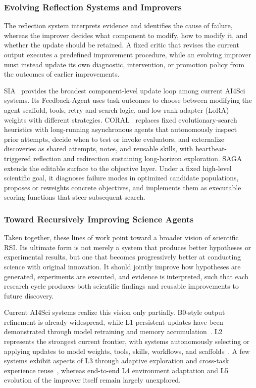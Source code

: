 \subsubsection{Evolving Reflection Systems and Improvers}

The reflection system interprets evidence and identifies the cause of failure, whereas the improver decides what component to modify, how to modify it, and whether the update should be retained. A fixed critic that revises the current output executes a predefined improvement procedure, while an evolving improver must instead update its own diagnostic, intervention, or promotion policy from the outcomes of earlier improvements.

SIA~\cite{hebbar2026sia} provides the broadest component-level update loop among current AI4Sci systems. Its Feedback-Agent uses task outcomes to choose between modifying the agent scaffold, tools, retry and search logic, and low-rank adapter (LoRA) weights with different strategies. 
CORAL~\cite{qu2026coral} replaces fixed evolutionary-search heuristics with long-running asynchronous agents that autonomously inspect prior attempts, decide when to test or invoke evaluators, and externalize discoveries as shared attempts, notes, and reusable skills, with heartbeat-triggered reflection and redirection sustaining long-horizon exploration.
SAGA~\cite{du2025saga} extends the editable surface to the objective layer. Under a fixed high-level scientific goal, it diagnoses failure modes in optimized candidate populations, proposes or reweights concrete objectives, and implements them as executable scoring functions that steer subsequent search.



\subsubsection{Toward Recursively Improving Science Agents}

Taken together, these lines of work point toward a broader vision of scientific RSI. Its ultimate form is not merely a system that produces better hypotheses or experimental results, but one that becomes progressively better at conducting science with original innovation. It should jointly improve how hypotheses are generated, experiments are executed, and evidence is interpreted, such that each research cycle produces both scientific findings and reusable improvements to future discovery.

Current AI4Sci systems realize this vision only partially. B0-style output refinement is already widespread, while L1 persistent updates have been demonstrated through model retraining and memory accumulation~\cite{yuksekgonul2026discover,khajeh2024polymer,lyu2026evoscientist}. L2 represents the strongest current frontier, with systems autonomously selecting or applying updates to model weights, tools, skills, workflows, and scaffolds~\cite{hebbar2026sia,lu2026tool,huang2025cascade}. A few systems exhibit aspects of L3 through adaptive exploration and cross-task experience reuse~\cite{qu2026coral,zhang2026drugsage}, whereas end-to-end L4 environment adaptation and L5 evolution of the improver itself remain largely unexplored.

